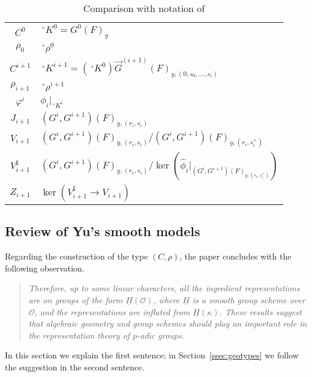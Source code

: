 \documentclass[10pt]{amsart}
\theoremstyle{plain}
\theoremstyle{definition}
\begin{document}
\begin{table}[htp]
\caption{Comparison with notation of \cite{yu:01a}}
\begin{center}
\begin{tabular}{c|l}
$C^0$ & $\,^\circ K^0 = G^0(F)_y$\\%
$\rho_0$ & $\,^\circ \rho^0$\\%
$C^{i+1}$ & $\,^\circ K^{i+1} = (\,^\circ K^0) \vec{G}^{(i+1)}(F)_{y,(0, s_0, \ldots, s_{i})}$\\%
$\rho_{i+1}$ & $\,^\circ \rho^{i+1}$\\%
$\varphi^i$ & $\phi_i\vert_{\,^\circ K^i }$ \\
$J_{i+1}$ & $(G^i,G^{i+1})(F)_{y, (r_i, s_i)}$ \\
$V_{i+1}$ & $(G^i,G^{i+1})(F)_{y, (r_i, s_i)}/ (G^i,G^{i+1})(F)_{y, (r_i, s_i^+)}$ \\ 
$V_{i+1}^\sharp$ & $(G^i,G^{i+1})(F)_{y, (r_i, s_i)}/ \ker(\widehat{\phi}_i\vert_{(G^i,G^{i+1})(F)_{y, (r_i, s_i^+)}})$ \\
$Z_{i+1}$ & $\ker(V_{i+1}^\sharp\to V_{i+1})$ %
\end{tabular}
\end{center}
\label{table:notation}
\end{table}%




\subsection{Review of Yu's smooth models}\label{ssec:models}

Regarding the construction of the type $(C,\rho)$, the paper \cite{yu:03a} concludes with the following observation.
\begin{quotation}
{\it Therefore, up to some linear characters, all the ingredient representations are on groups of
 the form $\underline{H}(\mathcal{O})$, where $\underline{H}$ is a smooth group scheme over $\mathcal{O}$, and the representations are inflated from $\underline{H}(\kappa)$. These results suggest that algebraic geometry and group schemes should play an
important role in the representation theory of $p$-adic groups.} %
\end{quotation}
In this section we explain the first sentence; in Section~\ref{ssec:geotypes} we follow the suggestion in the second sentence.
\end{document}
